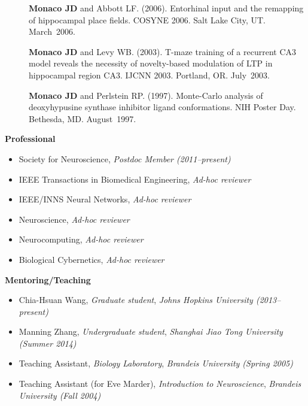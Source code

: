 \documentclass[10pt]{article}
\begin{document}
\begin{description}
\item[\quad] \textbf{Monaco JD} and Abbott LF. (2006). Entorhinal input and the remapping of hippocampal place fields. COSYNE 2006. Salt Lake City, UT. March~2006.
\item[\quad] \textbf{Monaco JD} and Levy WB. (2003). T-maze training of a recurrent CA3 model reveals the necessity of novelty-based modulation of LTP in hippocampal region CA3. IJCNN 2003. Portland, OR. July~2003.
\item[\quad] \textbf{Monaco JD} and Perlstein RP. (1997). Monte-Carlo analysis of deoxyhypusine synthase inhibitor ligand conformations. NIH Poster Day. Bethesda, MD. August~1997. 
\end{description}

{\large \textbf{Professional}}
\begin{itemize}
  \item Society for Neuroscience, \emph{Postdoc Member (2011--present)}
  \item IEEE Transactions in Biomedical Engineering, \emph{Ad-hoc reviewer}
  \item IEEE/INNS Neural Networks, \emph{Ad-hoc reviewer}
  \item Neuroscience, \emph{Ad-hoc reviewer}
  \item Neurocomputing, \emph{Ad-hoc reviewer}
  \item Biological Cybernetics, \emph{Ad-hoc reviewer}
\end{itemize}
  
{\large \textbf{Mentoring/Teaching}}
\begin{itemize}
  \item Chia-Hsuan Wang, \emph{Graduate student}, \emph{Johns Hopkins University (2013--present)}
  \item Manning Zhang, \emph{Undergraduate student}, \emph{Shanghai Jiao Tong University (Summer 2014)}
  \item Teaching Assistant, \emph{Biology Laboratory}, \emph{Brandeis University (Spring 2005)}
  \item Teaching Assistant (for Eve Marder), \emph{Introduction to Neuroscience}, \emph{Brandeis University (Fall 2004)}
\end{itemize}

\end{document}
